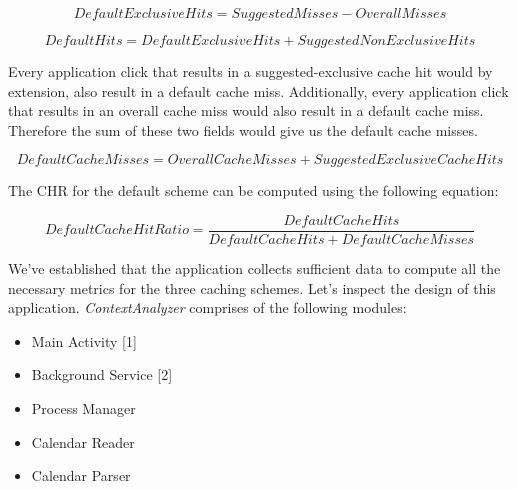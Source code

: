 \documentclass[12pt]{uthesis-v12}  %
\begin{document}
		\begin{equation}
			DefaultExclusive Hits = Suggested Misses - Overall Misses
		\end{equation}
		
		\begin{equation}
			Default Hits = DefaultExclusive Hits + Suggested NonExclusive Hits 
		\end{equation}
		
		Every application click that results in a suggested-exclusive cache hit would by extension, also result in a default cache miss. Additionally, every application click that results in an overall cache miss would also result in a default cache miss. Therefore the sum of these two fields would give us the default cache misses.
		
		\begin{equation}
			Default Cache Misses = Overall Cache Misses + Suggested Exclusive Cache Hits
		\end{equation}
		
		The CHR for the default scheme can be computed using the following equation:
		
		\begin{equation}
			Default Cache Hit Ratio = \frac{Default Cache Hits}{Default Cache Hits + Default Cache Misses}
		\end{equation}
		
		We've established that the application collects sufficient data to compute all the necessary metrics for the three caching schemes. Let's inspect the design of this application. {\em ContextAnalyzer} comprises of the following modules:
		
		\begin{itemize}
			\item Main Activity [1]
			\item Background Service [2]
			\item Process Manager
			\item Calendar Reader
			\item Calendar Parser
		\end{itemize}
		
\end{document}
